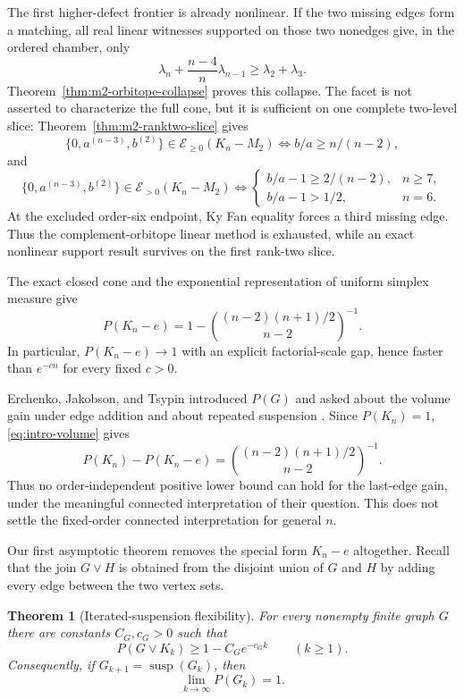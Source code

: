 \documentclass[11pt,reqno]{amsart}
\newtheorem{theorem}{Theorem}[section]
\theoremstyle{definition}
\theoremstyle{remark}
\newcommand{\susp}{\operatorname{susp}}
\begin{document}
The first higher-defect frontier is already nonlinear.  If the two missing
edges form a matching, all real linear witnesses supported on those two
nonedges give, in the ordered chamber, only
\begin{equation}\label{eq:intro-m2-facet}
 \lambda_n+\frac{n-4}{n}\lambda_{n-1}\ge\lambda_2+\lambda_3.
\end{equation}
Theorem~\ref{thm:m2-orbitope-collapse} proves this collapse.  The facet is
not asserted to characterize the full cone, but it is sufficient on one
complete two-level slice: Theorem~\ref{thm:m2-ranktwo-slice} gives
\[
 \{0,a^{(n-3)},b^{(2)}\}\in\mathcal E_{\ge0}(K_n-M_2)
 \iff b/a\ge n/(n-2),
\]
and
\[
 \{0,a^{(n-3)},b^{(2)}\}\in\mathcal E_{>0}(K_n-M_2)
 \iff
 \begin{cases}
  b/a-1\ge2/(n-2),&n\ge7,\\
  b/a-1>1/2,&n=6.
 \end{cases}
\]
At the excluded order-six endpoint, Ky Fan equality forces a third missing
edge.  Thus the complement-orbitope linear method is exhausted, while an exact
nonlinear support result survives on the first rank-two slice.

The exact closed cone and the exponential representation of uniform simplex
measure give
\begin{equation}\label{eq:intro-volume}
  P(K_n-e)
  =1-\binom{(n-2)(n+1)/2}{n-2}^{-1}.
\end{equation}
In particular, $P(K_n-e)\to1$ with an explicit factorial-scale gap, hence
faster than $e^{-cn}$ for every fixed $c>0$.

Erchenko, Jakobson, and Tsypin introduced $P(G)$ and asked about the volume
gain under edge addition and about repeated suspension
\cite[Questions~3--5]{EJT2026}.  Since $P(K_n)=1$,
\eqref{eq:intro-volume} gives
\[
  P(K_n)-P(K_n-e)
  =\binom{(n-2)(n+1)/2}{n-2}^{-1}.
\]
Thus no order-independent positive lower bound can hold for the last-edge
gain, under the meaningful connected interpretation of their question.  This
does not settle the fixed-order connected interpretation for general $n$.

Our first asymptotic theorem removes the special form $K_n-e$ altogether.
Recall
that the join $G\vee H$ is obtained from the disjoint union of $G$ and $H$ by
adding every edge between the two vertex sets.

\begin{theorem}[Iterated-suspension flexibility]\label{thm:intro-suspension}
For every nonempty finite graph $G$ there are constants $C_G,c_G>0$ such that
\begin{equation}\label{eq:intro-suspension}
  P(G\vee K_k)\ge 1-C_Ge^{-c_Gk}\qquad(k\ge1).
\end{equation}
Consequently, if $G_{k+1}=\susp(G_k)$, then
\[
  \lim_{k\to\infty}P(G_k)=1.
\]
\end{theorem}
\end{document}
